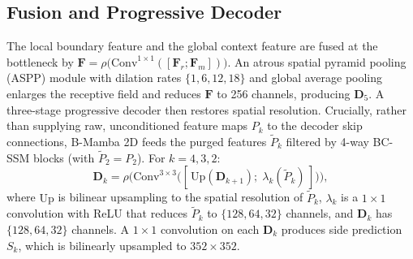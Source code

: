 \documentclass[journal]{IEEEtran}
\newcommand{\vect}[1]{\bm{#1}}
\begin{document}
\subsection{Fusion and Progressive Decoder}
The local boundary feature and the global context feature are fused at the bottleneck by $\vect{F}=\rho\big(\mathrm{Conv}^{1\times1}([\vect{F}_r;\vect{F}_m])\big)$. An atrous spatial pyramid pooling (ASPP) module \cite{chen2018deeplab} with dilation rates $\{1,6,12,18\}$ and global average pooling enlarges the receptive field and reduces $\vect{F}$ to 256 channels, producing $\vect{D}_5$. A three-stage progressive decoder then restores spatial resolution. Crucially, rather than supplying raw, unconditioned feature maps $P_k$ to the decoder skip connections, B-Mamba 2D feeds the purged features $\tilde{P}_k$ filtered by 4-way BC-SSM blocks (with $\tilde{P}_2=P_2$). For $k=4,3,2$:
\begin{equation}
  \vect{D}_k = \rho\big(\mathrm{Conv}^{3\times3}\big([\,\mathrm{Up}(\vect{D}_{k+1});\;\lambda_k(\tilde{P}_k)\,]\big)\big),
  \label{eq:decoder}
\end{equation}
where $\mathrm{Up}$ is bilinear upsampling to the spatial resolution of $\tilde{P}_k$, $\lambda_k$ is a $1\times1$ convolution with ReLU that reduces $\tilde{P}_k$ to $\{128,64,32\}$ channels, and $\vect{D}_k$ has $\{128,64,32\}$ channels. A $1\times1$ convolution on each $\vect{D}_k$ produces side prediction $S_k$, which is bilinearly upsampled to $352\times352$.
\end{document}
